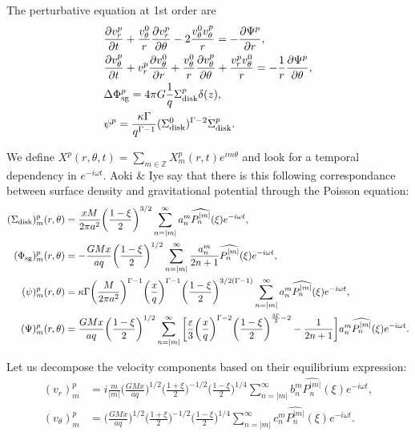 \documentclass[11pt]{article}
\newcommand{\vr}{v_{r}}
\newcommand{\vt}{v_{\theta}}
\newcommand{\Sigmad}{\Sigma_{\rm{disk}}}
\newcommand{\Phisg}{\Phi_{\rm{sg}}}
\newcommand{\anm}{a_n^m}
\newcommand{\bnm}{b_n^m}
\newcommand{\cnm}{c_n^m}
\newcommand{\Pnm}{P_n^{|m|}}
\newcommand{\hPnm}{\widehat{\Pnm}}
\begin{document}
The perturbative equation at 1st order are
\begin{align*}
&\frac{\partial \vr^p}{\partial t} + \frac{\vt^0}{r} \frac{\partial \vr^p}{\partial \theta} - 2\frac{\vt^0 \vt^p}{r} = -\frac{\partial \Psi^p}{\partial r} ,\\
&\frac{\partial \vt^p}{\partial t} + \vr^p \frac{\partial \vt^0}{\partial r} + \frac{\vt^0}{r} \frac{\partial \vt^p}{\partial \theta} + \frac{\vr^p\vt^0}{r} = -\frac{1}{r}\frac{\partial \Psi^p}{\partial \theta} ,\\
& \Delta \Phisg^p = 4\pi G \frac{1}{q} \Sigmad^p \delta (z), \\
& \psi^p =  \frac{\kappa \Gamma}{q^{\Gamma-1}} (\Sigmad^0)^{\Gamma-2} \Sigmad^p .
\end{align*}

We define $X^p(r,\theta,t) = \sum_{m\in \mathbb{Z}} X_m^p(r,t) e^{i m \theta}$ and look for a temporal dependency in $e^{-i \omega t}$.
Aoki \& Iye say that there is this following correspondance between surface density and gravitational potential through the Poisson equation:
\begin{align}
(\Sigmad)_m^p (r,\theta) &= \frac{xM}{2\pi a^2} \bigg(\frac{1-\xi}{2}\bigg)^{3/2} \sum_{n=|m|}^{\infty} \anm \hPnm(\xi) e^{-i \omega t} ,\\
(\Phisg)_m^p (r,\theta) &= -\frac{GMx}{a q} \bigg(\frac{1-\xi}{2}\bigg)^{1/2} \sum_{n=|m|}^{\infty} \frac{\anm}{2n+1} \hPnm(\xi) e^{-i \omega t} ,\\
(\psi)_m^p (r,\theta) &= \kappa \Gamma \bigg(\frac{M}{2\pi a^2} \bigg)^{\Gamma-1} \bigg(\frac{x}{q}\bigg)^{\Gamma-1} \bigg(\frac{1-\xi}{2}\bigg)^{3/2(\Gamma-1)} \sum_{n=|m|}^{\infty} \anm \hPnm(\xi) e^{-i \omega t} ,\\
(\Psi)_m^p (r,\theta) &= \frac{GMx}{a q } \bigg(\frac{1-\xi}{2}\bigg)^{1/2}\sum_{n=|m|}^{\infty} \bigg[\frac{\varepsilon}{3}  \bigg(\frac{x}{q}\bigg)^{\Gamma-2} \bigg(\frac{1-\xi}{2}\bigg)^{\frac{3\Gamma}{2}-2}  -\frac{1}{2n+1}  \bigg]\anm \hPnm(\xi)e^{-i \omega t} .
\end{align}

Let us decompose the velocity components based on their equilibrium expression:
\begin{align}
(\vr)_m^p &= i \frac{m}{|m|} \bigg(\frac{GMx}{aq}\bigg)^{1/2} \bigg(\frac{1+\xi}{2}\bigg)^{-1/2} \bigg(\frac{1-\xi}{2}\bigg)^{1/4} \sum_{n=|m|}^{\infty} \bnm \hPnm(\xi) e^{-i \omega t} ,\\
(\vt)_m^p &=\bigg(\frac{GMx}{aq}\bigg)^{1/2} \bigg(\frac{1+\xi}{2}\bigg)^{-1/2} \bigg(\frac{1-\xi}{2}\bigg)^{1/4} \sum_{n=|m|}^{\infty} \cnm \hPnm(\xi) e^{-i \omega t} .
\end{align}
\end{document}
